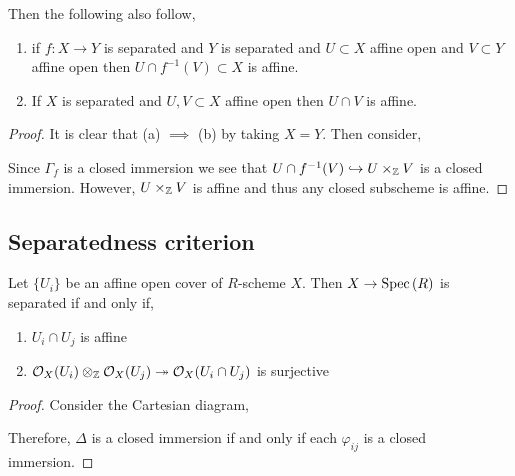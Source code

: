 \documentclass[12pt]{article}
\begin{document}
\begin{cor}
Then the following also follow,
\begin{enumerate}
\item if $f : X \to Y$ is separated and $Y$ is separated and $U \subset X$ affine open and $V \subset Y$ affine open then $U \cap f^{-1}(V) \subset X$ is affine.
\item If $X$ is separated and $U, V \subset X$ affine open then $U \cap V$ is affine.
\end{enumerate}
\end{cor}

\begin{proof}
It is clear that (a) $\implies$ (b) by taking $X = Y$. Then consider,
\begin{center}
\end{center}
Since $\Gamma_f$ is a closed immersion we see that $U \cap f^{-1}(V) \hookrightarrow U \times_{\mathbb{Z}} V$ is a closed immersion. However, $U \times_{\mathbb{Z}} V$ is affine and thus any closed subscheme is affine.
\end{proof}

\subsection{Separatedness criterion}

\begin{lemma}
Let $\{ U_i \}$ be an affine open cover of $R$-scheme $X$. Then $X \to \mathrm{Spec}\left( R \right)$ is separated if and only if,
\begin{enumerate}
\item $U_i \cap U_j$ is affine 
\item $\mathcal{O}_{X}(U_i) \otimes_{\mathbb{Z}} \mathcal{O}_{X}(U_j) \twoheadrightarrow \mathcal{O}_{X}(U_i \cap U_j)$ is surjective
\end{enumerate}
\end{lemma}

\begin{proof}
Consider the Cartesian diagram,
\begin{center}
\end{center}
Therefore, $\Delta$ is a closed immersion if and only if each $\varphi_{ij}$ is a closed immersion. 
\end{proof}
\end{document}
